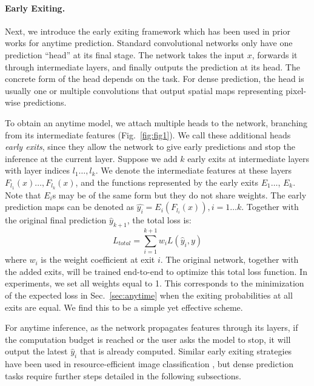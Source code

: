 \documentclass{article} %
\renewcommand{\cite}{\citep}
\begin{document}
\paragraph{Early Exiting.}
Next, we introduce the early exiting framework which has been used in prior works \cite{huang2017multi,teerapittayanon2016branchynet} for anytime prediction. Standard convolutional networks only have one prediction ``head'' at its final stage.
The network takes the input $x$, forwards it through intermediate layers, and finally outputs the prediction at its head.
The concrete form of the head depends on the task. 
For dense prediction, the head is usually one or multiple convolutions that output spatial maps representing pixel-wise predictions. 

To obtain an anytime model, we attach multiple heads to the network, branching from its intermediate features (Fig.~\ref{fig:fig1}).
We call these additional heads \emph{early exits}, since they allow the network to give early predictions and stop the inference at the current layer.
Suppose we add $k$ early exits at intermediate layers with layer indices $l_1 \dots, l_k$.
We denote the intermediate features at these layers $F_{l_1}(x) \dots, F_{l_k}(x)$, and the functions represented by the early exits $E_1 \dots$, $E_k$. 
Note that $E_i$s may be of the same form but they do not share weights.
The early prediction maps can be denoted as $\hat{y_i} = E_i(F_{l_i}(x)), i = 1 \dots k$.
Together with the original final prediction $\hat{y}_{k+1}$, the total loss is: 
\vspace{-1.5ex}
\begin{equation}
L_{total} = \sum_{i=1}^{k+1} {w_i}L(\hat{y}_i, y)
\end{equation}
where $w_i$ is the weight coefficient at exit $i$.
The original network, together with the added exits, will be trained end-to-end to optimize this total loss function.
In experiments, we set all weights equal to 1.
This corresponds to the minimization of the expected loss in Sec.~\ref{sec:anytime} when the exiting probabilities at all exits are equal.
We find this to be a simple yet effective scheme.

For anytime inference, as the network propagates features through its layers, if the computation budget is reached or the user asks the model to stop, it will output the latest $\hat{y}_{i}$ that is already computed.
Similar early exiting strategies have been used in  resource-efficient image classification \cite{teerapittayanon2016branchynet,huang2017multi}, but dense prediction tasks require further steps detailed in the following subsections.
\end{document}

